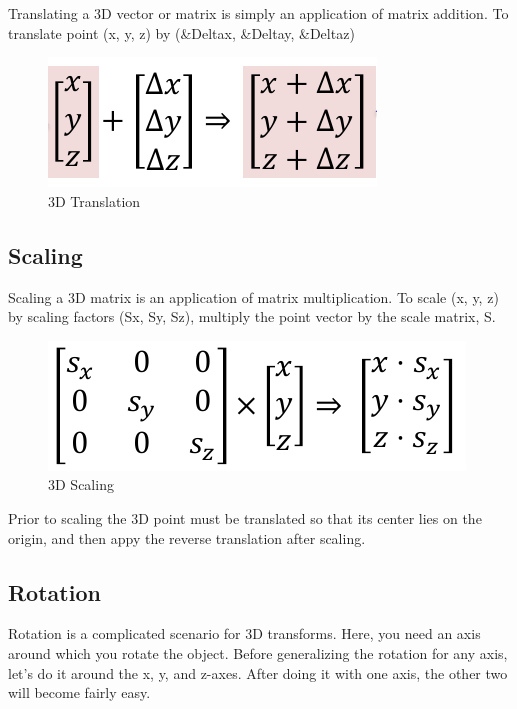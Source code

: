 \documentclass[
]{book}
\begin{document}
Translating a 3D vector or matrix is simply an application of matrix addition. To translate point (x, y, z) by
(\&Deltax, \&Deltay, \&Deltaz)

\begin{figure}
\centering
\includegraphics{img/08-image12.png}
\caption{\label{fig:3d-translation}3D Translation}
\end{figure}

\hypertarget{scaling}{%
\subsection{Scaling}\label{scaling}}

Scaling a 3D matrix is an application of matrix multiplication. To scale (x, y, z) by scaling factors (Sx, Sy, Sz), multiply the point vector by the scale matrix, S.

\begin{figure}
\centering
\includegraphics{img/08-image13.png}
\caption{\label{fig:3d-scaling}3D Scaling}
\end{figure}

Prior to scaling the 3D point must be translated so that its center lies on the origin, and then appy the reverse translation after scaling.

\hypertarget{rotation}{%
\subsection{Rotation}\label{rotation}}

Rotation is a complicated scenario for 3D transforms. Here, you need an axis around which you rotate the object.
Before generalizing the rotation for any axis, let's do it around the x, y, and z-axes. After doing it with one axis, the other two will become fairly easy.
\end{document}
